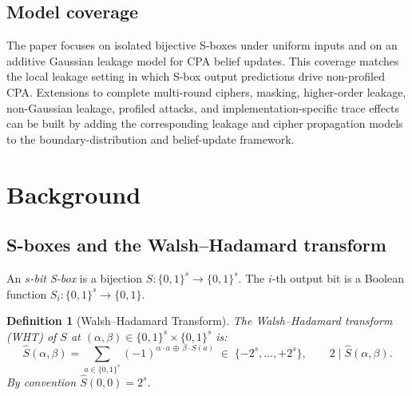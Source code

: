 \documentclass[referee,lineno,pdflatex,sn-mathphys-num]{sn-jnl}
\theoremstyle{thmstylethree}
\newtheorem{definition}{Definition}[section]
\theoremstyle{thmstyletwo}
\theoremstyle{thmstyleone}
\newcommand{\WHT}{\widehat}
\newcommand{\B}[1]{\{0,1\}^{#1}}
\begin{document}
\subsection{Model coverage}\label{subsec:scope}

The paper focuses on isolated bijective S-boxes under uniform inputs and on an
additive Gaussian leakage model for CPA belief updates.  This coverage matches
the local leakage setting in which S-box output predictions drive non-profiled
CPA.  Extensions to complete multi-round ciphers, masking, higher-order
leakage, non-Gaussian leakage, profiled attacks, and implementation-specific
trace effects can be built by adding the corresponding leakage and cipher
propagation models to the boundary-distribution and belief-update framework.

\section{Background}\label{sec:background}

\subsection{S-boxes and the Walsh--Hadamard transform}

An \emph{$s$-bit S-box} is a bijection $S : \B{s} \to \B{s}$.
The $i$-th output bit is a Boolean function $S_i : \B{s}\to\{0,1\}$.

\begin{definition}[Walsh--Hadamard Transform]\label{def:wht}
The Walsh--Hadamard transform (WHT) of $S$ at $(\alpha,\beta)\in\B{s}\times\B{s}$ is:
\begin{equation}\label{eq:wht}
  \WHT{S}(\alpha,\beta)
  = \sum_{a\in\B{s}} (-1)^{\alpha\cdot a\,\oplus\,\beta\cdot S(a)}
  \;\in\; \{-2^s,\ldots,+2^s\},
  \qquad 2\mid\WHT{S}(\alpha,\beta).
\end{equation}
By convention $\WHT{S}(0,0)=2^s$.
\end{definition}
\end{document}
